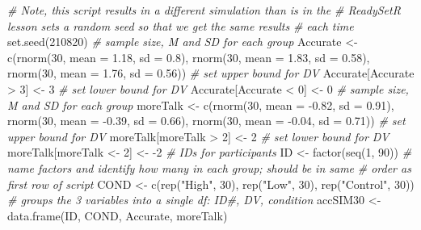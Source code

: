 \documentclass[
  11pt,
]{book}
\newenvironment{Shaded}{\begin{snugshade}}{\end{snugshade}}
\newcommand{\AttributeTok}[1]{\textcolor[rgb]{0.77,0.63,0.00}{#1}}
\newcommand{\CommentTok}[1]{\textcolor[rgb]{0.56,0.35,0.01}{\textit{#1}}}
\newcommand{\DecValTok}[1]{\textcolor[rgb]{0.00,0.00,0.81}{#1}}
\newcommand{\FloatTok}[1]{\textcolor[rgb]{0.00,0.00,0.81}{#1}}
\newcommand{\FunctionTok}[1]{\textcolor[rgb]{0.00,0.00,0.00}{#1}}
\newcommand{\NormalTok}[1]{#1}
\newcommand{\OtherTok}[1]{\textcolor[rgb]{0.56,0.35,0.01}{#1}}
\newcommand{\SpecialCharTok}[1]{\textcolor[rgb]{0.00,0.00,0.00}{#1}}
\newcommand{\StringTok}[1]{\textcolor[rgb]{0.31,0.60,0.02}{#1}}
\begin{document}
\begin{Shaded}
\begin{Highlighting}[]
\CommentTok{\# Note, this script results in a different simulation than is in the}
\CommentTok{\# ReadySetR lesson sets a random seed so that we get the same results}
\CommentTok{\# each time}
\FunctionTok{set.seed}\NormalTok{(}\DecValTok{210820}\NormalTok{)}
\CommentTok{\# sample size, M and SD for each group}
\NormalTok{Accurate }\OtherTok{\textless{}{-}} \FunctionTok{c}\NormalTok{(}\FunctionTok{rnorm}\NormalTok{(}\DecValTok{30}\NormalTok{, }\AttributeTok{mean =} \FloatTok{1.18}\NormalTok{, }\AttributeTok{sd =} \FloatTok{0.8}\NormalTok{), }\FunctionTok{rnorm}\NormalTok{(}\DecValTok{30}\NormalTok{, }\AttributeTok{mean =} \FloatTok{1.83}\NormalTok{,}
    \AttributeTok{sd =} \FloatTok{0.58}\NormalTok{), }\FunctionTok{rnorm}\NormalTok{(}\DecValTok{30}\NormalTok{, }\AttributeTok{mean =} \FloatTok{1.76}\NormalTok{, }\AttributeTok{sd =} \FloatTok{0.56}\NormalTok{))}
\CommentTok{\# set upper bound for DV}
\NormalTok{Accurate[Accurate }\SpecialCharTok{\textgreater{}} \DecValTok{3}\NormalTok{] }\OtherTok{\textless{}{-}} \DecValTok{3}
\CommentTok{\# set lower bound for DV}
\NormalTok{Accurate[Accurate }\SpecialCharTok{\textless{}} \DecValTok{0}\NormalTok{] }\OtherTok{\textless{}{-}} \DecValTok{0}
\CommentTok{\# sample size, M and SD for each group}
\NormalTok{moreTalk }\OtherTok{\textless{}{-}} \FunctionTok{c}\NormalTok{(}\FunctionTok{rnorm}\NormalTok{(}\DecValTok{30}\NormalTok{, }\AttributeTok{mean =} \SpecialCharTok{{-}}\FloatTok{0.82}\NormalTok{, }\AttributeTok{sd =} \FloatTok{0.91}\NormalTok{), }\FunctionTok{rnorm}\NormalTok{(}\DecValTok{30}\NormalTok{, }\AttributeTok{mean =} \SpecialCharTok{{-}}\FloatTok{0.39}\NormalTok{,}
    \AttributeTok{sd =} \FloatTok{0.66}\NormalTok{), }\FunctionTok{rnorm}\NormalTok{(}\DecValTok{30}\NormalTok{, }\AttributeTok{mean =} \SpecialCharTok{{-}}\FloatTok{0.04}\NormalTok{, }\AttributeTok{sd =} \FloatTok{0.71}\NormalTok{))}
\CommentTok{\# set upper bound for DV}
\NormalTok{moreTalk[moreTalk }\SpecialCharTok{\textgreater{}} \DecValTok{2}\NormalTok{] }\OtherTok{\textless{}{-}} \DecValTok{2}
\CommentTok{\# set lower bound for DV}
\NormalTok{moreTalk[moreTalk }\OtherTok{\textless{}{-}} \DecValTok{2}\NormalTok{] }\OtherTok{\textless{}{-}} \SpecialCharTok{{-}}\DecValTok{2}
\CommentTok{\# IDs for participants}
\NormalTok{ID }\OtherTok{\textless{}{-}} \FunctionTok{factor}\NormalTok{(}\FunctionTok{seq}\NormalTok{(}\DecValTok{1}\NormalTok{, }\DecValTok{90}\NormalTok{))}
\CommentTok{\# name factors and identify how many in each group; should be in same}
\CommentTok{\# order as first row of script}
\NormalTok{COND }\OtherTok{\textless{}{-}} \FunctionTok{c}\NormalTok{(}\FunctionTok{rep}\NormalTok{(}\StringTok{"High"}\NormalTok{, }\DecValTok{30}\NormalTok{), }\FunctionTok{rep}\NormalTok{(}\StringTok{"Low"}\NormalTok{, }\DecValTok{30}\NormalTok{), }\FunctionTok{rep}\NormalTok{(}\StringTok{"Control"}\NormalTok{, }\DecValTok{30}\NormalTok{))}
\CommentTok{\# groups the 3 variables into a single df: ID\#, DV, condition}
\NormalTok{accSIM30 }\OtherTok{\textless{}{-}} \FunctionTok{data.frame}\NormalTok{(ID, COND, Accurate, moreTalk)}
\end{Highlighting}
\end{Shaded}
\end{document}
